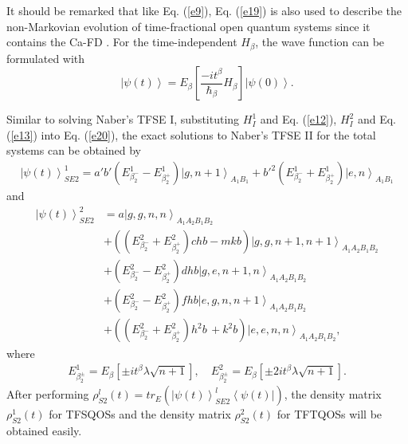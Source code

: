 \documentclass[
showpacs,  %
showkeys,  %
aps,       %
amsthm,    %
amsmath,   %
amsfonts,  %
amssymb    %
]{revtex4-1}          %
\begin{document}
It should be remarked that like Eq. (\ref{e9}), Eq. (\ref{e19}) is also used to describe the non-Markovian evolution of time-fractional open quantum systems since it contains the Ca-FD \cite{Iomin2019}. For the time-independent ${H_\beta}$, the wave function can be formulated with
\begin{equation}
\label{e20}
\left| {\psi (t)} \right\rangle  = {E_\beta }\left[ {\frac{{ - i{t^\beta }}}{{{\hbar _\beta }}}{H_\beta }} \right]\left| {\psi (0)} \right\rangle.
\end{equation}

Similar to solving Naber's TFSE I, substituting ${H^1_I}$ and Eq. (\ref{e12}), ${H^2_I}$ and Eq. (\ref{e13}) into Eq. (\ref{e20}), the exact solutions to Naber's TFSE II for the total systems can be obtained by
\begin{equation}
\label{e21}
\begin{aligned}
{\left|{\psi(t)} \right\rangle_{SE2}^{1}}=a'b'({E_{\beta_2^ - }^1}-{E_{\beta_2^ + }^1}){\left| {g,n + 1} \right\rangle_{{A_1}{B_1}}}+{{b'}^2}({E_{\beta_2^ - }^1}+{E_{\beta_2^ + }^1}){\left|{e,n} \right\rangle_{{A_1}{B_1}}}
\end{aligned}
\end{equation}
and
\begin{equation}
\label{e22}
\begin{aligned}
{\left|{\psi(t)} \right\rangle_{SE2}^{2}} &= a{\left| {g,g,n,n} \right\rangle_{{A_1}{A_2}{B_1}{B_2}}}\\
&+(({E_{\beta_2^ - }^2}+{E_{\beta_2^ + }^2})chb - mkb){\left| {g,g,n + 1,n + 1} \right\rangle _{{A_1}{A_2}{B_1}{B_2}}}\\
&+ ({E_{\beta_2^ - }^2}-{E_{\beta_2^ + }^2})dhb{\left| {g,e,n + 1,n} \right\rangle _{{A_1}{A_2}{B_1}{B_2}}}\\
&+ ({E_{\beta_2^ - }^2}-{E_{\beta_2^ + }^2})fhb{\left| {e,g,n,n + 1} \right\rangle _{{A_1}{A_2}{B_1}{B_2}}}\,\\
&+ (({E_{\beta_2^ -}^2}+{E_{\beta_2^ + }^2}){h^2}b\, + {k^2}b){\left| {e,e,n,n} \right\rangle _{{A_1}{A_2}{B_1}{B_2}}},
\end{aligned}
\end{equation}
where
\begin{equation}
\label{e23}
\begin{aligned}
E_{\beta_2^\pm}^1 = {E_\beta }\left[{\pm {i{t^\beta}}\lambda\sqrt {n+1}}\right],\,\,\,\,\,\,
E_{\beta_2^\pm}^2 = {E_\beta}\left[{\pm 2i{t^\beta}\lambda \sqrt {n+1}}\right].
\end{aligned}
\end{equation}
After performing ${\rho_{S2}^{l}(t)} = t{r_E}({\left| {\psi (t)} \right\rangle _{SE2}^{l}}\left\langle {\psi (t)} \right|)$, the density matrix ${\rho_{S2}^{1}(t)}$ for TFSQOSs and the density matrix ${\rho_{S2}^{2}(t)}$ for TFTQOSs will be obtained easily.
\end{document}
